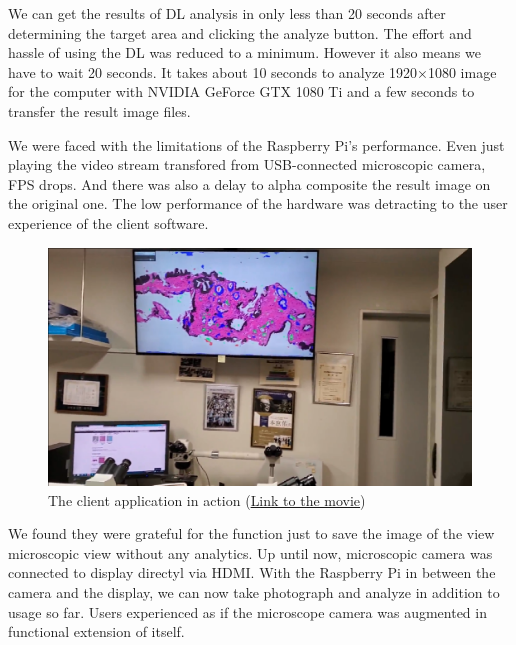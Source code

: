We can get the results of DL analysis in only less than 20 seconds after determining the target area and clicking the analyze button. The effort and hassle of using the DL was reduced to a minimum. However it also means we have to wait 20 seconds. It takes about 10 seconds to analyze 1920×1080 image for the computer with NVIDIA GeForce GTX 1080 Ti and a few seconds to transfer the result image files.

We were faced with the limitations of the Raspberry Pi's performance. Even just playing the video stream transfored from USB-connected microscopic camera, FPS drops. And there was also a delay to alpha composite the result image on the original one. The low performance of the hardware was detracting to the user experience of the client software.

\begin{figure}[t]\centering
  \includegraphics[keepaspectratio]{assets/thumb.png}
  \caption{The client application in action (\href{https://drive.google.com/file/d/16hUGZ2jU2Def9N5ozNaZnLvjnWc-kkNP/view}{Link to the movie})}
  \label{fig:in_action}
\end{figure}

We found they were grateful for the function just to save the image of the view microscopic view without any analytics. Up until now, microscopic camera was connected to display directyl via HDMI.  With the Raspberry Pi in between the camera and the display, we can now take photograph and analyze in addition to usage so far.  Users experienced as if the microscope camera was augmented in functional extension of itself.


